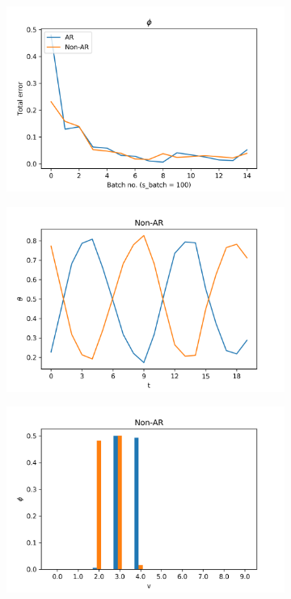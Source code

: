 \documentclass[12pt]{article}
\begin{document}
\begin{figure}[H]
\begin{subfigure}[b]{0.3\textwidth}
  \end{subfigure}%

  \begin{subfigure}[b]{0.3\textwidth}
    \includegraphics[width=\linewidth]{performance_phis_experiment-1|overlapping-yes_dataset-8.png}
  \end{subfigure}%
  \begin{subfigure}[b]{0.3\textwidth}
    \includegraphics[width=\linewidth]{latent_thetas_Non-AR_experiment-1|overlapping-yes_dataset-8.png}
  \end{subfigure}%
  \begin{subfigure}[b]{0.3\textwidth}
    \includegraphics[width=\linewidth]{latent_phis_Non-AR_experiment-1|overlapping-yes_dataset-8.png}

\end{subfigure}
\end{figure}
\end{document}
